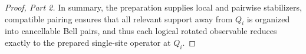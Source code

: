 \begin{proof}[Proof, Part 2]
In summary, the preparation supplies local and pairwise stabilizers,
compatible pairing ensures that all relevant support away from $Q_i$ is
organized into cancellable Bell pairs, and thus each logical rotated
observable reduces exactly to the prepared single-site operator at $Q_i$.
\end{proof}
